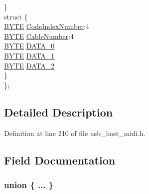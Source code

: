 \begin{DoxyCompactItemize}
\begin{tabbing}
\>\} \\
\>struct \{\\
\>\>\hyperlink{_generic_type_defs_8h_a4ae1dab0fb4b072a66584546209e7d58}{BYTE} \hyperlink{union_u_s_b___a_u_d_i_o___m_i_d_i___p_a_c_k_e_t_a2fd05aa164b4303c308f426f04666b0c}{CodeIndexNumber}:4\\
\>\>\hyperlink{_generic_type_defs_8h_a4ae1dab0fb4b072a66584546209e7d58}{BYTE} \hyperlink{union_u_s_b___a_u_d_i_o___m_i_d_i___p_a_c_k_e_t_a8e9aec21dcb7b98b04c771b5ee5a81c8}{CableNumber}:4\\
\>\>\hyperlink{_generic_type_defs_8h_a4ae1dab0fb4b072a66584546209e7d58}{BYTE} \hyperlink{union_u_s_b___a_u_d_i_o___m_i_d_i___p_a_c_k_e_t_a3c7963dd2ced3f0f298d12d48df20bc9}{DATA\_0}\\
\>\>\hyperlink{_generic_type_defs_8h_a4ae1dab0fb4b072a66584546209e7d58}{BYTE} \hyperlink{union_u_s_b___a_u_d_i_o___m_i_d_i___p_a_c_k_e_t_aa1444557cb650dc2ff0cff34e6e6ec5e}{DATA\_1}\\
\>\>\hyperlink{_generic_type_defs_8h_a4ae1dab0fb4b072a66584546209e7d58}{BYTE} \hyperlink{union_u_s_b___a_u_d_i_o___m_i_d_i___p_a_c_k_e_t_add89fc8d5878aeee730376ca04a48162}{DATA\_2}\\
\>\} \\
\}; \\

\end{tabbing}\end{DoxyCompactItemize}


\subsection{Detailed Description}


Definition at line 210 of file usb\+\_\+host\+\_\+midi.\+h.



\subsection{Field Documentation}
\hypertarget{union_u_s_b___a_u_d_i_o___m_i_d_i___p_a_c_k_e_t_af68e8725326b15b20fc219bacfaf94ae}{}\subsubsection[{"@418}]{\setlength{\rightskip}{0pt plus 5cm}union \{ ... \} }\label{union_u_s_b___a_u_d_i_o___m_i_d_i___p_a_c_k_e_t_af68e8725326b15b20fc219bacfaf94ae}
\hypertarget{union_u_s_b___a_u_d_i_o___m_i_d_i___p_a_c_k_e_t_a8e9aec21dcb7b98b04c771b5ee5a81c8}{}
